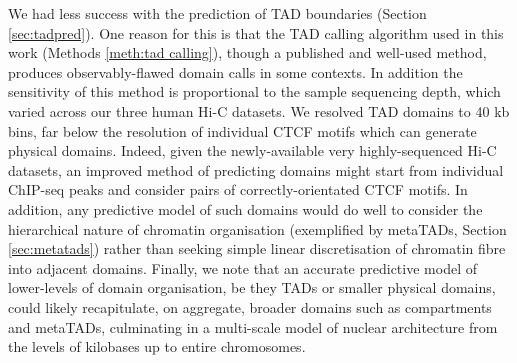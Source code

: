 \documentclass[a4paper,11pt,oneside]{book}
\begin{document}
We had less success with the prediction of TAD boundaries (Section \ref{sec:tadpred}). One reason for this is that the TAD calling algorithm used in this work\cite{Dixon2012} (Methods \ref{meth:tad calling}), though a published and well-used method, produces observably-flawed domain calls in some contexts. In addition the sensitivity of this method is proportional to the sample sequencing depth, which varied across our three human Hi-C datasets. We resolved TAD domains to 40 kb bins, far below the resolution of individual CTCF motifs which can generate physical domains. Indeed, given the newly-available very highly-sequenced Hi-C datasets,\cite{Rao2014} an improved method of predicting domains might start from individual ChIP-seq peaks and consider pairs of correctly-orientated CTCF motifs. In addition, any predictive model of such domains would do well to consider the hierarchical nature of chromatin organisation (exemplified by metaTADs, Section \ref{sec:metatads}) rather than seeking simple linear discretisation of chromatin fibre into adjacent domains. Finally, we note that an accurate predictive model of lower-levels of domain organisation, be they TADs or smaller physical domains, could likely recapitulate, on aggregate, broader domains such as compartments and metaTADs, culminating in a multi-scale model of nuclear architecture from the levels of kilobases up to entire chromosomes.


\end{document}

